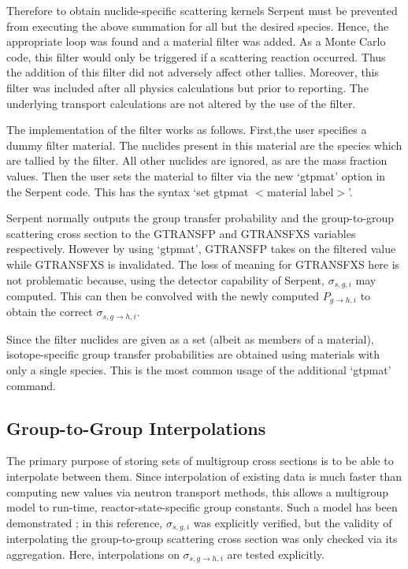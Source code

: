 \documentclass{physor2012}
\begin{document}
Therefore to obtain nuclide-specific scattering kernels Serpent must be prevented
from executing the above summation for all but the desired species.  Hence, the
appropriate loop was found and a material filter was added.  As a Monte Carlo code,
this filter would only be triggered if a scattering reaction occurred.  Thus the
addition of this filter did not adversely affect other tallies.  Moreover, this
filter was included after all physics calculations but prior to reporting.  The
underlying transport calculations are not altered by the use of the filter.

The implementation of the filter works as follows. First,the user specifies
a dummy filter material.  The nuclides present in this material are the species
which are tallied by the filter.  All other nuclides are ignored, as are the mass
fraction values.  Then the user sets the material to filter via the new `gtpmat'
option in the Serpent code.  This has the syntax `set gtpmat $<$material label$>$'.

Serpent normally outputs the group transfer probability and the group-to-group
scattering cross section to the GTRANSFP and GTRANSFXS variables respectively.
However by using `gtpmat', GTRANSFP takes on the filtered value while GTRANSFXS
is invalidated.  The loss of meaning for GTRANSFXS here is not problematic
because, using the detector capability of Serpent, $\sigma_{s,g,i}$ may computed.
This can then be convolved with the newly computed $P_{g\to h,i}$ to obtain
the correct $\sigma_{s,g\to h,i}$.

Since the filter nuclides are given as a set (albeit as members of a material),
isotope-specific group transfer probabilities are obtained using materials with
only a single species.  This is the most common usage of the additional `gtpmat'
command.

\subsection{Group-to-Group Interpolations}

The primary purpose of storing sets of multigroup cross sections is
to be able to interpolate between them.  Since interpolation of existing
data is much faster than computing new values via neutron
transport methods, this allows a multigroup model to
run-time, reactor-state-specific group constants.  Such a model has been
demonstrated \cite{}; in this reference, $\sigma_{s,g,i}$ was explicitly
verified, but the validity of interpolating the group-to-group scattering
cross section was only checked via its aggregation.  Here, interpolations on
$\sigma_{s,g\to h,i}$ are tested explicitly.
\end{document}
